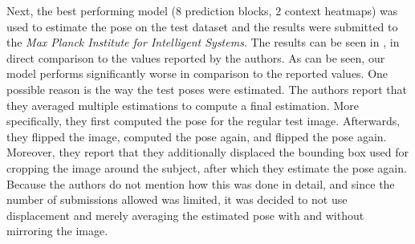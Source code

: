 Next, the best performing model ($8$ prediction blocks, $2$ context heatmaps) was used to estimate the pose on the test dataset and the results were submitted to the \textit{Max Planck Institute for Intelligent Systems}.
The results can be seen in , in direct comparison to the values reported by the authors.
As can be seen, our model performs significantly worse in comparison to the reported values.
One possible reason is the way the test poses were estimated.
The authors report that they averaged multiple estimations to compute a final estimation.
More specifically, they first computed the pose for the regular test image.
Afterwards, they flipped the image, computed the pose again, and flipped the pose again.
Moreover, they report that they additionally displaced the bounding box used for cropping the image around the subject, after which they estimate the pose again.
Because the authors do not mention how this was done in detail, and since the number of submissions allowed was limited, it was decided to not use displacement and merely averaging the estimated pose with and without mirroring the image.




